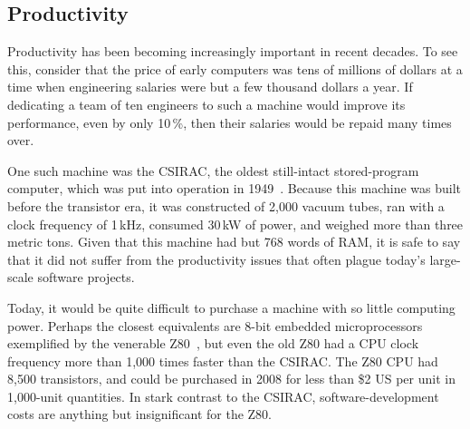 \fi

\subsection{Productivity}
\label{sec:intro:Productivity}

\QuickQuizEnd

Productivity has been becoming increasingly important in recent decades.
To see this, consider that the price of early computers was tens
of millions of dollars at
a time when engineering salaries were but a few thousand dollars a year.
If dedicating a team of ten engineers to such a machine would improve
its performance, even by only 10\,\%, then their salaries
would be repaid many times over.

One such machine was the CSIRAC, the oldest still-intact stored-program
computer, which was put into operation in
1949~\cite{CSIRACMuseumVictoria,CSIRACUniversityMelbourne}.
Because this machine was built before the transistor era, it was constructed
of 2,000 vacuum tubes, ran with a clock frequency of 1\,kHz,
consumed 30\,kW of power, and weighed more than three metric tons.
Given that this machine had but 768 words of RAM, it is safe to say that
it did not suffer from the productivity issues that often plague
today's large-scale software projects.

Today, it would be quite difficult to purchase a machine with so
little computing power.
Perhaps the closest equivalents
are 8-bit embedded microprocessors exemplified by the venerable
Z80~\cite{z80Wikipedia}, but even the old Z80 had a CPU clock
frequency more than 1,000 times faster than the CSIRAC\@.
The Z80 CPU had 8,500 transistors, and could be purchased in 2008
for less than \$2 US per unit in 1,000-unit quantities.
In stark contrast to the CSIRAC, software-development costs are
anything but insignificant for the Z80.

